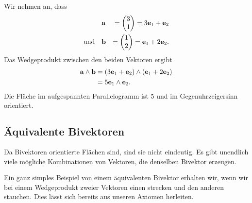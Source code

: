 Wir nehmen an, dass 
\begin{equation}
  \begin{aligned}
    &\mathbf{a} &= \begin{pmatrix} 3 \\ 1 \end{pmatrix} = 3 \mathbf{e}_1 + \mathbf{e}_2 \\
    \text{und}\quad
    &\mathbf{b} &= \begin{pmatrix} 1 \\ 2 \end{pmatrix} = \mathbf{e}_1 + 2 \mathbf{e}_2.
  \end{aligned}
\end{equation}
Das Wedgeprodukt zwischen den beiden Vektoren ergibt
\begin{equation}
  \begin{aligned}
    \mathbf{a} \wedge \mathbf{b} &= (3 \mathbf{e}_1 + \mathbf{e}_2) \wedge (\mathbf{e}_1 + 2 \mathbf{e}_2) \\
    &= 5 \mathbf{e}_1 \wedge \mathbf{e}_2.
  \end{aligned}
\end{equation}
Die Fläche im aufgespannten Parallelogramm ist $5$ und im Gegenuhrzeigersinn orientiert.

\subsection{Äquivalente Bivektoren}
Da Bivektoren orientierte Flächen sind, sind sie nicht eindeutig. Es gibt unendlich viele mögliche Kombinationen von Vektoren,
die denselben Bivektor erzeugen.

Ein ganz simples Beispiel von einem äquivalenten Bivektor erhalten wir, wenn wir bei einem Wedgeprodukt zweier Vektoren einen strecken
und den anderen stauchen. Dies lässt sich bereits aus unseren Axiomen herleiten.

